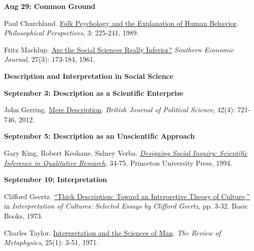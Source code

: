\documentclass[letterpaper]{article}
\renewenvironment{itemize}{
  \begin{list}{}{
    \setlength{\leftmargin}{1.5em}
  }
}{
  \end{list}
}
\begin{document}
\begin{enumerate}
		\begin{itemize}
		\item {\bf Aug 29: Common Ground}
			\begin{itemize}
					\item[$\bullet$] Paul Churchland. \href{http://www.jstor.org/stable/2214269}{Folk Psychology and the Explanation of Human Behavior}. \emph{Philosophical Perspectives}, 3: 225-241, 1989. 
					\item[$\bullet$] Fritz Machlup. \href{http://www.jstor.org/stable/1055084}{Are the Social Sciences Really Inferior?} \emph{Southern Economic Journal}, 27(3): 173-184, 1961. 
			\end{itemize}
		\end{itemize}


\item {\bf Description and Interpretation in Social Science}
		
		\begin{itemize}
		\item {\bf September 3: Description as a Scientific Enterprise}
			\begin{itemize}
					\item[$\bullet$] John Gerring. \href{http://www.jstor.org/stable/23274165}{Mere Description}. \emph{British Journal of Political Science}, 42(4): 721-746, 2012. 
		\end{itemize}
		\end{itemize}


		\begin{itemize}
		\item {\bf September 5: Description as an Unscientific Approach}
			\begin{itemize}
					\item[$\bullet$] Gary King, Robert Keohane, Sidney Verba. \href{https://sites.duke.edu/niou/files/2014/06/king94book.pdf}{\emph{Designing Social Inquiry: Scientific Inference in Qualitative Research}}, 34-75. Princeton University Press, 1994.
			\end{itemize}
		\end{itemize}

		\begin{itemize}
		\item {\bf September 10: Interpretation}
			\begin{itemize}
					\item[$\bullet$] Clifford Geertz. \href{https://quod.lib.umich.edu/cache/h/e/b/heb01005.0001.001/00000011.tif.30.pdf#page=3;zoom=75}{``Thick Description: Toward an Interpretive Theory of Culture,''} in \emph{Interpretation of Cultures: Selected Essays by Clifford Geertz}, pp. 3-32. Basic Books, 1973. 
					\item[$\bullet$] Charles Taylor. \href{http://www.jstor.org/stable/20125928}{Interpretation and the Sciences of Man}. \emph{The Review of Metaphysics}, 25(1): 3-51, 1971.
			\end{itemize}
		\end{itemize}



\end{enumerate}
\end{document}
